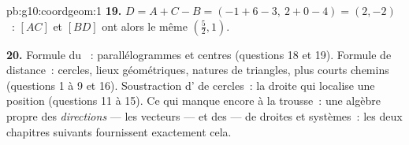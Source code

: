 \begin{solution}{pb:g10:coordgeom:1}
\textbf{19.} $D = A + C - B = (-1 + 6 - 3,\ 2 + 0 - 4) = (2, -2)$~:
$[AC]$ et $[BD]$ ont alors le même 
$\left(\frac52, 1\right)$.

\textbf{20.} Formule du ~: parallélogrammes et centres
(questions 18 et 19). Formule de distance~: cercles, lieux
géométriques, natures de triangles, plus courts chemins (questions 1
à 9 et 16). Soustraction d' de cercles~: la droite qui
localise une position (questions 11 à 15). Ce qui manque encore à la
trousse~: une algèbre propre des \emph{directions} --- les vecteurs
--- et des \emph{} ---  de droites et
systèmes~: les deux chapitres suivants fournissent exactement cela.
\end{solution}
